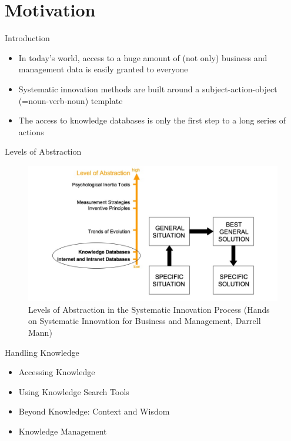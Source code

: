\documentclass{beamer}
\title{Hands on Systematic Innovation\\
	Problem Solving Tools - Knowledge
	\vskip1em}
\subtitle{Presentation in the Module 10-202-2312}
\author{Cecilia Graiff}
\date{June 28^{th}, 2022}
\begin{document}
	\begin{frame}[plain]
		\maketitle
	\end{frame}

	\section{Motivation}
	\begin{frame}{Introduction}
        \begin{itemize}
				\item In today's world, access to a huge amount of (not only) business and management data is easily granted to everyone
				\item Systematic innovation methods are built around a subject-action-object (=noun-verb-noun) template
				\item The access to knowledge databases is only the first step to a long series of actions
			\end{itemize}
		\end{frame}
		
	\begin{frame}{Levels of Abstraction}
	        \begin{figure}
				\centering
				\includegraphics[scale=0.4]{figure_3.jpg}
				\caption{Levels of Abstraction in the Systematic Innovation Process (Hands on Systematic Innovation for Business and Management, Darrell Mann)}
			\end{figure}
	\end{frame}
		
	\begin{frame}{Handling Knowledge}
        \begin{itemize}
				\item Accessing Knowledge
				\item Using Knowledge Search Tools
				\item Beyond Knowledge: Context and Wisdom
				\item Knowledge Management
			\end{itemize}

	\end{frame}
\end{document}
